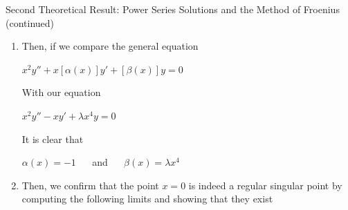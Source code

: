 \documentclass{beamer}
\begin{document}
\begin{frame}{Second Theoretical Result: Power Series Solutions and the Method of Froenius (continued)}

\begin{enumerate}

\suite

\item Then, if we compare the general equation

\begin{center}

\begin{minipage}{6cm}

\begin{varblock}[6cm]

$x^2y'' + x[\alpha(x)]y' + [\beta(x)]y=0$

\end{varblock}

\end{minipage}

\end{center}

With our equation

\begin{center}

\begin{minipage}{4cm}

\begin{varblock}[4cm]

$x^2y''-xy'+\lambda x^4y=0$

\end{varblock}

\end{minipage}

\end{center}

It is clear that

\begin{center}

\begin{minipage}{6cm}

\begin{varblock}[6cm]

$\alpha(x)=-1$ $\quad$ and $\quad$ $\beta(x)=\lambda x^4$

\end{varblock}

\end{minipage}

\end{center}

\item Then, we confirm that the point $x=0$ is indeed a regular singular point by computing the following limits and showing that they exist


\end{enumerate}
\end{frame}
\end{document}
